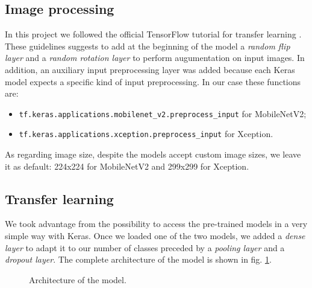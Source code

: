 \documentclass[12pt]{llncs}
\begin{document}
\subsection{Image processing}
In this project we followed the official TensorFlow tutorial for transfer learning \cite{tf-transfer}. These guidelines suggests to add at the beginning of the model a \textit{random flip layer} and a \textit{random rotation layer} to perform augumentation on input images. In addition, an auxiliary input preprocessing layer was added because each Keras model expects a specific kind of input preprocessing. In our case these functions are:
\begin{itemize}
\item \texttt{tf.keras.applications.mobilenet\_v2.preprocess\_input} for MobileNetV2;
\item \texttt{tf.keras.applications.xception.preprocess\_input} for Xception.
\end{itemize}
As regarding image size, despite the models accept custom image sizes, we leave it as default: 224x224 for MobileNetV2 and 299x299 for Xception.

\subsection{Transfer learning}
We took advantage from the possibility to access the pre-trained models in a very simple way with Keras. Once we loaded one of the two models, we added a \textit{dense layer} to adapt it to our number of classes preceded by a \textit{pooling layer} and a \textit{dropout layer}. The complete architecture of the model is shown in fig. \ref{fig:model}.

\begin{figure}[h]
	\centering
    \caption{Architecture of the model.}
    \label{fig:model}
\end{figure}
\end{document}
